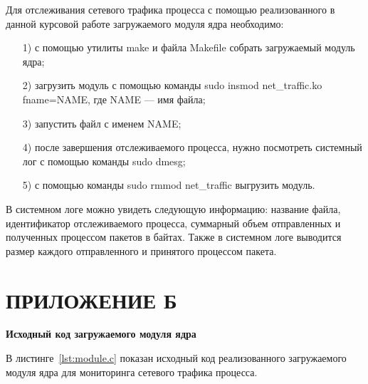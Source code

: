 \documentclass{bmstu}
\begin{document}
Для отслеживания сетевого трафика процесса с помощью реализованного в данной курсовой работе загружаемого модуля ядра необходимо:
\begin{enumerate}
\item[1)] с помощью утилиты make и файла Makefile собрать загружаемый модуль ядра;
\item[2)] загрузить модуль с помощью команды sudo insmod net\_traffic.ko fname=NAME, где NAME --- имя файла;
\item[3)] запустить файл с именем NAME;
\item[4)] после завершения отслеживаемого процесса, нужно посмотреть системный лог с помощью команды sudo dmesg;
\item[5)] с помощью команды sudo rmmod net\_traffic выгрузить модуль.
\end{enumerate}

В системном логе можно увидеть следующую информацию: название файла, идентификатор отслеживаемого процесса, суммарный объем отправленных и полученных процессом пакетов в байтах. 
Также в системном логе выводится размер каждого отправленного и принятого процессом пакета.

{\centering \chapter*{ПРИЛОЖЕНИЕ Б}}
\begin{center}
\textbf{Исходный код загружаемого модуля ядра}
\end{center}

В листинге~\ref{lst:module.c} показан исходный код реализованного загружаемого модуля ядра для мониторинга сетевого трафика процесса.

\end{document}
